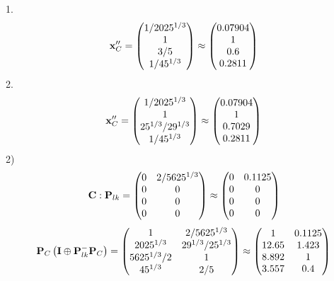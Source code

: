 \documentclass[10pt,a4paper]{article}
\begin{document}
	1.
	\[
		\bold{x}''_{C} = 
		\begin{pmatrix}
			{1} / {{2025^ {1 / 3}}} \\
			{1}{} \\
			{{3}} / {{5}} \\
			{1} / {{45^ {1 / 3}}} \\
		\end{pmatrix}
		\approx
		\begin{pmatrix}
			0.07904  \\
			1        \\
			0.6      \\
			0.2811   \\
		\end{pmatrix}
	\]
	2.
	\[
		\bold{x}''_{C} = 
		\begin{pmatrix}
			{1} / {{2025^ {1 / 3}}} \\
			{1}{} \\
			{{25^ {1 / 3}}} / {{2}{9^ {1 / 3}}} \\
			{1} / {{45^ {1 / 3}}} \\
		\end{pmatrix}
		\approx
		\begin{pmatrix}
			0.07904  \\
			1        \\
			0.7029   \\
			0.2811   \\
		\end{pmatrix}
	\]
	2)
	\[
		\bold{C}: \bold{P}_{lk} = 
		\begin{pmatrix}
			{{0}}{} & {{2}} / {{5625^ {1 / 3}}} \\
			{{0}}{} & {{0}}{} \\
			{{0}}{} & {{0}}{} \\
			{{0}}{} & {{0}}{} \\
		\end{pmatrix}
		\approx
		\begin{pmatrix}
			0        & 0.1125   \\
			0        & 0        \\
			0        & 0        \\
			0        & 0        \\
		\end{pmatrix}
	\]
	\[
		\bold{P}_{C}\left(\bold{I} \oplus \bold{P}_{lk}^{-}\bold{P}_{C}\right) = 
		\begin{pmatrix}
			{1}{} & {{2}} / {{5625^ {1 / 3}}} \\
			{{2025^ {1 / 3}}}{} & {{2}{9^ {1 / 3}}} / {{25^ {1 / 3}}} \\
			{{5625^ {1 / 3}}} / {{2}} & {1}{} \\
			{{45^ {1 / 3}}}{} & {{2}} / {{5}} \\
		\end{pmatrix}
		\approx
		\begin{pmatrix}
			1        & 0.1125   \\
			12.65    & 1.423    \\
			8.892    & 1        \\
			3.557    & 0.4      \\
		\end{pmatrix}
	\]
\end{document}
